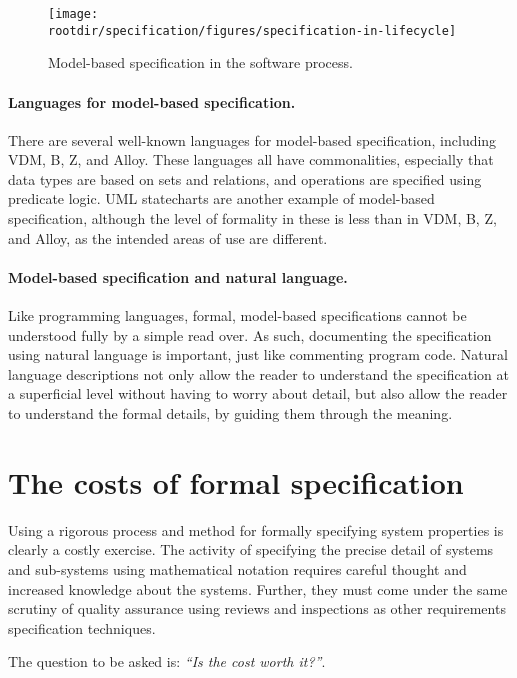 \begin{figure}[!h]
\centering
\texttt{[image: \\rootdir/specification/figures/specification-in-lifecycle]}
\caption{Model-based specification in the software process.}
\label{fig:specification:sdlc}
\end{figure}

\paragraph{Languages for model-based specification.}
There are several well-known languages for model-based specification, including VDM, B, Z, and Alloy. These languages all have commonalities, especially that data types are based on sets and relations, and operations are specified using predicate logic. UML statecharts are another example of model-based specification, although the level of formality in these is less than in VDM, B, Z, and Alloy, as the intended areas of use are different.

\paragraph{Model-based specification and natural language.}
Like programming languages, formal, model-based specifications cannot be understood fully by a simple read over. As such, documenting the specification using natural language is important, just like commenting program code. Natural language descriptions not only allow the reader to understand the specification at a superficial level without having to worry about detail, but also allow the reader to understand the formal details, by guiding them through the meaning.


\section{The costs of formal specification}
\label{sec:specification:costs}

Using a rigorous process and method for formally specifying system properties is clearly a costly exercise. The activity of specifying the precise detail of systems and sub-systems using mathematical notation requires careful thought and increased knowledge about the systems. Further, they must come under the same scrutiny of quality assurance using reviews and inspections as other requirements specification techniques. 

The question to be asked is: \emph{``Is the cost worth it?''}.

